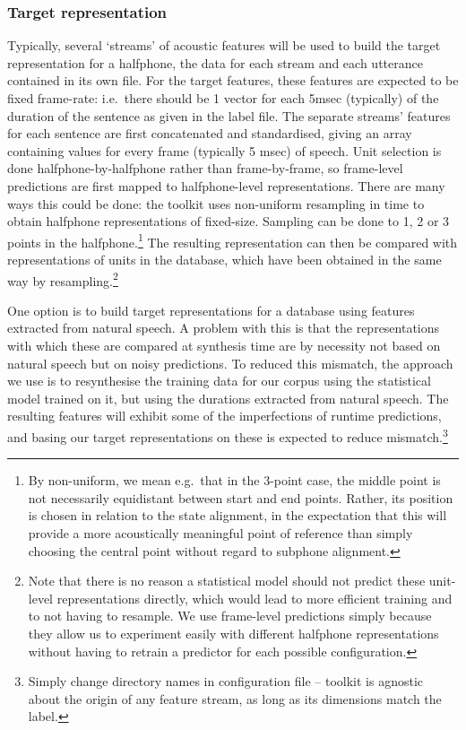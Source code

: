 \subsubsection{Target representation}
Typically, several `streams' of acoustic features will be used to build the target representation for a halfphone, the data for each stream and each utterance contained in its own file. For the target features, these features are expected to be fixed frame-rate: i.e.\ there should be 1 vector for each 5msec (typically) of the duration of the sentence as given in the label file. The separate streams' features for each sentence are first concatenated and standardised, giving an array containing values for every frame (typically 5 msec) of speech. Unit selection is done halfphone-by-halfphone rather than frame-by-frame, so frame-level predictions are first mapped to halfphone-level representations. There are many ways this could be done: the toolkit uses non-uniform resampling in time to obtain halfphone representations of fixed-size. Sampling can be done to 1, 2 or 3 points in the halfphone.\footnote{By non-uniform, we mean e.g.\ that in the 3-point case, the middle point is not necessarily equidistant between start and end points. Rather, its position is chosen in relation to the state alignment, in the expectation that this will provide a more acoustically meaningful point of reference than simply choosing the central point without regard to subphone alignment.} The resulting representation can then be compared with representations of units in the database, which have been obtained in the same way by resampling.\footnote{Note that there is no reason a statistical model should not predict these unit-level representations directly, which would lead to more efficient training and to not having to resample. We use frame-level predictions simply because they allow us to experiment easily with different halfphone representations without having to retrain a predictor for each possible configuration.}

One option is to build target representations for a database using features extracted from natural speech. A problem with this is that the representations with which these are compared at synthesis time are by necessity not based on natural speech but on noisy predictions. To reduced this mismatch, the approach we use is to resynthesise the training data for our corpus using the statistical model trained on it, but using the durations extracted from natural speech. The resulting features will exhibit some of the imperfections of runtime predictions, and basing our target representations on these is expected to reduce mismatch.\footnote{Simply change directory names in configuration file -- toolkit is agnostic about the origin of any feature stream, as long as its dimensions match the label.}


